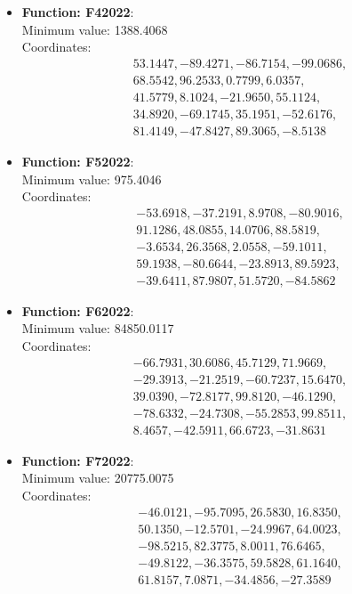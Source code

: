 \documentclass{article}
\begin{document}
\begin{itemize}
  \item \textbf{Function: F42022}: \\
    Minimum value: 1388.4068 \\
    Coordinates:
    \[
      \begin{aligned}
        & 53.1447, -89.4271, -86.7154, -99.0686, \\
        & 68.5542, 96.2533, 0.7799, 6.0357, \\
        & 41.5779, 8.1024, -21.9650, 55.1124, \\
        & 34.8920, -69.1745, 35.1951, -52.6176, \\
        & 81.4149, -47.8427, 89.3065, -8.5138
      \end{aligned}
    \]

  \item \textbf{Function: F52022}: \\
    Minimum value: 975.4046 \\
    Coordinates:
    \[
      \begin{aligned}
        & -53.6918, -37.2191, 8.9708, -80.9016, \\
        & 91.1286, 48.0855, 14.0706, 88.5819, \\
        & -3.6534, 26.3568, 2.0558, -59.1011, \\
        & 59.1938, -80.6644, -23.8913, 89.5923, \\
        & -39.6411, 87.9807, 51.5720, -84.5862
      \end{aligned}
    \]

  \item \textbf{Function: F62022}: \\
    Minimum value: 84850.0117 \\
    Coordinates:
    \[
      \begin{aligned}
        & -66.7931, 30.6086, 45.7129, 71.9669, \\
        & -29.3913, -21.2519, -60.7237, 15.6470, \\
        & 39.0390, -72.8177, 99.8120, -46.1290, \\
        & -78.6332, -24.7308, -55.2853, 99.8511, \\
        & 8.4657, -42.5911, 66.6723, -31.8631
      \end{aligned}
    \]

  \item \textbf{Function: F72022}: \\
    Minimum value: 20775.0075 \\
    Coordinates:
    \[
      \begin{aligned}
        & -46.0121, -95.7095, 26.5830, 16.8350, \\
        & 50.1350, -12.5701, -24.9967, 64.0023, \\
        & -98.5215, 82.3775, 8.0011, 76.6465, \\
        & -49.8122, -36.3575, 59.5828, 61.1640, \\
        & 61.8157, 7.0871, -34.4856, -27.3589
      \end{aligned}
    \]


\end{itemize}
\end{document}
